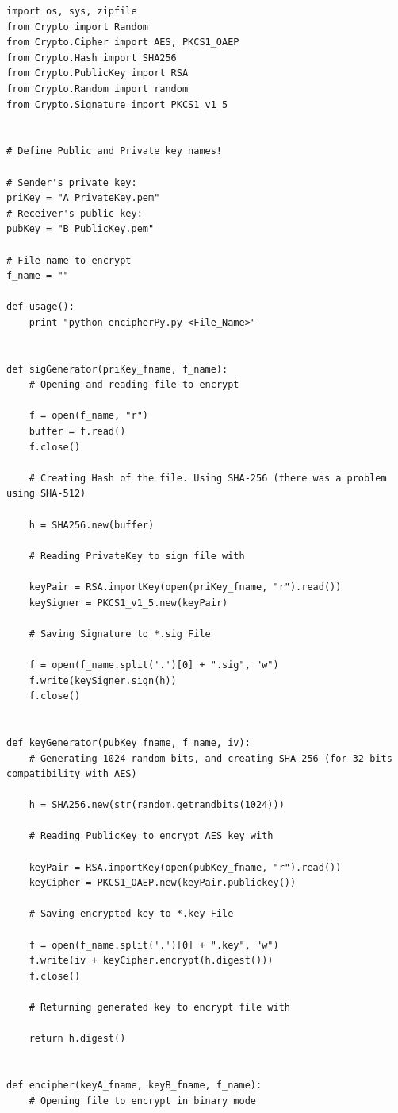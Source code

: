 \documentclass[a4paper,11pt,openright,oneside]{report}
\begin{document}
\begin{verbatim}
import os, sys, zipfile
from Crypto import Random
from Crypto.Cipher import AES, PKCS1_OAEP
from Crypto.Hash import SHA256
from Crypto.PublicKey import RSA
from Crypto.Random import random
from Crypto.Signature import PKCS1_v1_5


# Define Public and Private key names!

# Sender's private key:
priKey = "A_PrivateKey.pem"
# Receiver's public key:
pubKey = "B_PublicKey.pem"

# File name to encrypt
f_name = ""

def usage():
    print "python encipherPy.py <File_Name>"


def sigGenerator(priKey_fname, f_name):
    # Opening and reading file to encrypt

    f = open(f_name, "r")
    buffer = f.read()
    f.close()

    # Creating Hash of the file. Using SHA-256 (there was a problem using SHA-512)

    h = SHA256.new(buffer)

    # Reading PrivateKey to sign file with

    keyPair = RSA.importKey(open(priKey_fname, "r").read())
    keySigner = PKCS1_v1_5.new(keyPair)

    # Saving Signature to *.sig File

    f = open(f_name.split('.')[0] + ".sig", "w")
    f.write(keySigner.sign(h))
    f.close()


def keyGenerator(pubKey_fname, f_name, iv):
    # Generating 1024 random bits, and creating SHA-256 (for 32 bits compatibility with AES)

    h = SHA256.new(str(random.getrandbits(1024)))

    # Reading PublicKey to encrypt AES key with

    keyPair = RSA.importKey(open(pubKey_fname, "r").read())
    keyCipher = PKCS1_OAEP.new(keyPair.publickey())

    # Saving encrypted key to *.key File

    f = open(f_name.split('.')[0] + ".key", "w")
    f.write(iv + keyCipher.encrypt(h.digest()))
    f.close()

    # Returning generated key to encrypt file with

    return h.digest()


def encipher(keyA_fname, keyB_fname, f_name):
    # Opening file to encrypt in binary mode


\end{verbatim}
\end{document}
